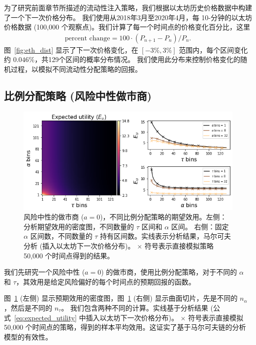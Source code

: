 \documentclass[sigconf, dvipsnames]{acmart}
\newcommand{\dcp}[1]{\textcolor{blue}{{\scriptsize{David:}}#1}}
\newcommand{\rithvik}[1]{\textcolor{cyan}{{\scriptsize{Rithvik: }}[[#1]]}}
\begin{document}
\quad 为了研究前面章节所描述的流动性注入策略，我们根据以太坊历史价格数据中构建了一个下一次价格分布。
我们使用从2018年3月至2020年4月，每 10-分钟的以太坊价格数据 (100,000 个观察点)。我们计算了每一个时间点的价格变化百分比，这里
\begin{align}
    \text{percent change} = 100 \cdot (P_{n+1} - P_{n}) / P_{n}.
\end{align}
%
图~\ref{fig:eth_dist} 显示了下一次价格变化，在 $[-3\%,3\%]$ 范围内，每个区间变化约 $0.046\%$，共129个区间的概率分布情况。
我们使用此分布来控制价格变化的随机过程，以模拟不同流动性分配策略的回报。



\subsection{比例分配策略 (风险中性做市商)}

\begin{figure}
    \centering
    \includegraphics[width=0.8\linewidth]{img/result_sim.png}
    \caption{风险中性的做市商 ($a=0$)，不同比例分配策略的期望效用。左侧：分析期望效用的密度图，不同数量的 $\tau$ 区间和 $\alpha$ 区间。
    右侧：固定 $\alpha$ 区间数，不同数量的 $\tau$ 持有区间数。实线表示分析结果，马尔可夫分析 (插入以太坊下一次价格分布)。
    $\times$ 符号表示直接模拟策略 50,000 个时间点得到的结果。
    \label{fig:result_sim}}
\end{figure}

\quad 我们先研究一个风险中性 ($a=0$) 的做市商，使用比例分配策略，对于不同的 $\alpha$ 和 $\tau$，其效用是给定风险偏好的每个时间点的预期回报的函数。

图~\ref{fig:result_sim} (左侧) 显示预期效用的密度图，图~\ref{fig:result_sim} (右侧) 显示曲面切片，先是不同的 $n_{\alpha}$，然后是不同的 $n_{\tau}$。
我们包含两种不同的计算。实线基于分析结果 (公式~\ref{eq:expected_utility} 中插入以太坊下一次价格分布)。
$\times$ 符号表示直接模拟 50,000 个时间点的策略，得到的样本平均效用。这证实了基于马尔可夫链的分析模型的有效性。
\end{document}
